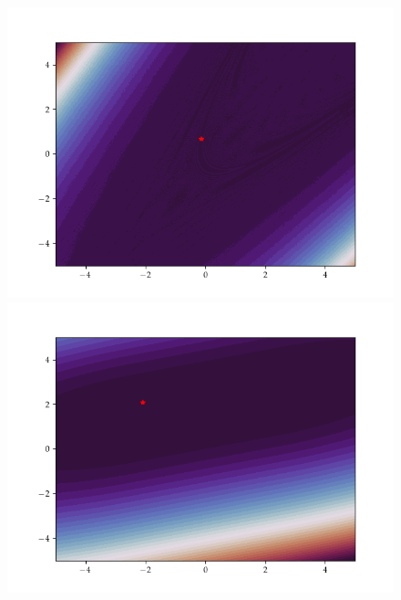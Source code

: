 \begin{figure}[h]
    \begin{minipage}[b]{0.32\textwidth}
      \includegraphics[trim=2.5cm 1.3cm 2.5cm 1.3cm,clip,width=\textwidth]{Figures/coco/f19.png}
    \end{minipage}
    \hfill
    \begin{minipage}[b]{0.32\textwidth}
      \includegraphics[trim=2.5cm 1.3cm 2.5cm 1.3cm,clip,width=\textwidth]{Figures/coco/f20.png}
    \end{minipage}
    \hfill
    \begin{minipage}[b]{0.32\textwidth}

\end{minipage}
\end{figure}
